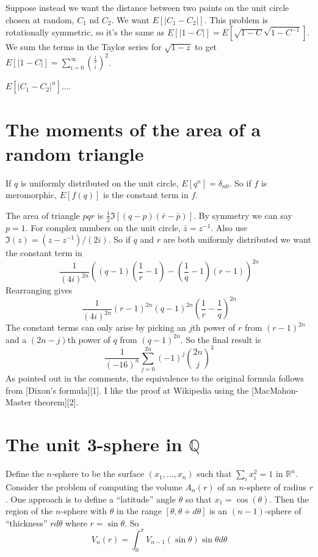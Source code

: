 \documentclass{article}
\begin{document}
Suppose instead we want the distance between two points on the unit circle chosen at random, $C_1$ nd $C_2$.
We want $E[|C_1-C_2|]$.
This problem is rotationally symmetric, so it's the same as $E[|1-C|]=E[\sqrt{1-C}\sqrt{1-C^{-1}}]$.
We sum the terms in the Taylor series for $\sqrt{1-z}$ to get
$E[|1-C|]=\sum_{i=0}^\infty{\frac{1}{2} \choose i}^2$.

$E[|C_1-C_2|^n]\ldots$.

\section{The moments of the area of a random triangle}
If $q$ is uniformly distributed on the unit circle, $E[q^n]=\delta_{n0}$. So if $f$ is meromorphic, $E[f(q)]$ is the constant term in $f$.

The area of triangle $pqr$ is $\frac12\Im[(q-p)(\bar{r}-\bar{p})]$. By symmetry we can say $p=1$. For complex numbers on the unit circle, $\bar{z}=z^{-1}$. Also use $\Im(z)=(z-z^{-1})/(2i)$. So if $q$ and $r$ are both uniformly distributed we want the constant term in
$$
\frac{1}{(4i)^{2n}}\left((q-1)(\frac 1r-1)-(\frac1q-1)(r-1)\right)^{2n}
$$
Rearranging gives
$$
\frac{1}{(4i)^{2n}}(r-1)^{2n}(q-1)^{2n}\left(\frac1r-\frac1q\right)^{2n}
$$
The constant terms can only arise by picking an $j$th power of $r$ from $(r-1)^{2n}$ and a $(2n-j)$th power of $q$ from $(q-1)^{2n}$. So the final result is
$$
\frac{1}{(-16)^{n}}\sum_{j=0}^{2n}(-1)^j{2n\choose j}^3
$$
As pointed out in the comments, the equivalence to the original formula follows from [Dixon's formula][1]. I like the proof at Wikipedia using the [MacMahon-Master theorem][2].

\section{The unit 3-sphere in $\mathbb{Q}$}
Define the $n$-sphere to be the surface $(x_1,\ldots,x_n)$ such that $\sum_ix_i^2=1$ in $\mathbb{R}^n$.
Consider the problem of computing the volume $A_n(r)$ of an $n$-sphere of radius $r$.
One approach is to define a ``latitude'' angle $\theta$ so that $x_1=\cos(\theta)$.
Then the region of the $n$-sphere with $\theta$ in the range $[\theta,\theta+d\theta]$ is an $(n-1)$-sphere of ``thickness'' $rd\theta$ where $r=\sin\theta$. So
\[
V_n(r) = \int_0^\pi V_{n-1}(\sin\theta)\sin\theta d\theta
\]
\end{document}
